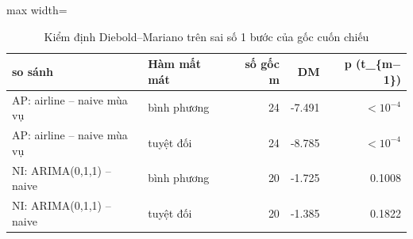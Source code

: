 \begin{table}[H]
\centering\small
\caption{Kiểm định Diebold–Mariano trên sai số 1 bước của gốc cuốn chiếu}\label{tab:tab_b12_13_diebold_mariano}
\begin{adjustbox}{max width=\linewidth}
\begin{tabular}{llrrr}
\toprule
so sánh & Hàm mất mát & số gốc m & DM & p (t\_\{m$-$1\}) \\
\midrule
AP: airline – naive mùa vụ & bình phương & 24 & -7.491 & $<10^{-4}$ \\
AP: airline – naive mùa vụ & tuyệt đối & 24 & -8.785 & $<10^{-4}$ \\
NI: ARIMA(0,1,1) – naive & bình phương & 20 & -1.725 & 0.1008 \\
NI: ARIMA(0,1,1) – naive & tuyệt đối & 20 & -1.385 & 0.1822 \\
\bottomrule
\end{tabular}
\end{adjustbox}
\end{table}
